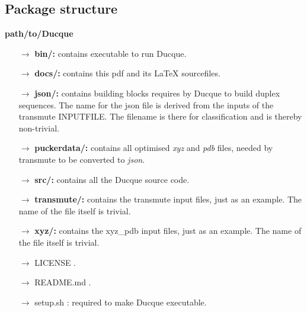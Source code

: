 \subsection{Package structure}
\textbf{path/to/Ducque}
%
\begin{itemize}[leftmargin=*]
    \setlength{\itemsep}{-1mm}
    \item[$\rightarrow$] \textbf{bin/:} contains executable to run Ducque.
    \item[$\rightarrow$] \textbf{docs/:} contains this pdf and its \LaTeX \hspace{1mm} sourcefiles.
    \item[$\rightarrow$] \textbf{json/:} contains building blocks requires by Ducque to build duplex sequences. The name for the json file is derived from the inputs of the \verb --transmute  INPUTFILE. The filename is there for classification and is thereby non-trivial.
    \item[$\rightarrow$] \textbf{puckerdata/:} contains all optimised \textit{xyz} and \textit{pdb} files, needed by \verb --transmute  to be converted to \textit{json}.
    \item[$\rightarrow$] \textbf{src/:} contains all the Ducque source code.
    \item[$\rightarrow$] \textbf{transmute/:} contains the \verb --transmute  input files, just as an example. The name of the file itself is trivial.
    \item[$\rightarrow$] \textbf{xyz/:} contains the \verb --xyz_pdb  input files, just as an example. The name of the file itself is trivial.
    \item[$\rightarrow$] LICENSE .
    \item[$\rightarrow$] README.md .
    \item[$\rightarrow$] setup.sh : required to make Ducque executable.
\end{itemize}
